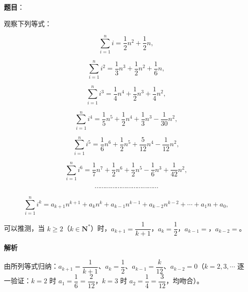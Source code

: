 \begin{answer}

\textbf{题目}：

观察下列等式：

\nopagebreak[4]
\[\sum_{i=1}^ni=\frac12n^2+\frac12n,\]

\nopagebreak[4]
\[\sum_{i=1}^ni^2=\frac13n^3+\frac12n^2+\frac16n,\]

\nopagebreak[4]
\[\sum_{i=1}^ni^3=\frac14n^4+\frac12n^3+\frac14n^2,\]

\nopagebreak[4]
\[\sum_{i=1}^ni^4=\frac15n^5+\frac12n^4+\frac13n^3-\frac1{30}n^2,\]

\nopagebreak[4]
\[\sum_{i=1}^ni^5=\frac16n^6+\frac12n^5+\frac5{12}n^4-\frac1{12}n^2,\]

\nopagebreak[4]
\[\sum_{i=1}^ni^6=\frac17n^7+\frac12n^6+\frac12n^5-\frac16n^3+\frac1{42}n^2,\]

\nopagebreak[4]
\[\cdots\cdots\cdots\cdots\cdots\cdots\cdots\cdots\cdots\cdots\cdots\cdots\]

\nopagebreak[4]
\[\sum_{i=1}^ni^k=a_{k+1}n^{k+1}+a_kn^k+a_{k-1}n^{k-1}+a_{k-2}n^{k-2}+\cdots+a_1n+a_0,\]

可以推测，当 $k\geqslant2$（$k\in\mathbf N^*$）时，$a_{k+1}=\dfrac1{k+1}$，$a_k=\dfrac12$，$a_{k-1}=$\gkblank{}，$a_{k-2}=$\gkblank{}。

\textbf{解析}

由所列等式归纳：$a_{k+1}=\dfrac1{k+1}$、$a_k=\dfrac12$、$a_{k-1}=\dfrac k{12}$、$a_{k-2}=0$（$k=2,3,\cdots$ 逐一验证：$k=2$ 时 $a_1=\dfrac16=\dfrac2{12}$，$k=3$ 时 $a_2=\dfrac14=\dfrac3{12}$，均吻合）。


\end{answer}
